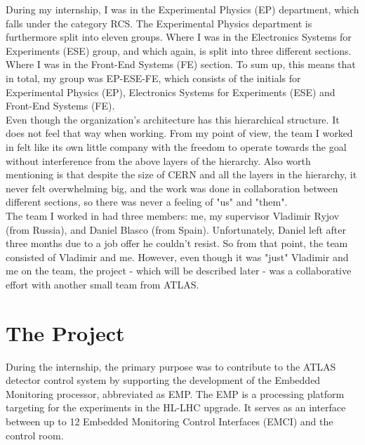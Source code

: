 \noindent During my internship, I was in the Experimental Physics (EP) department, which falls under the category RCS. The Experimental Physics department is furthermore split into eleven groups. Where I was in the Electronics Systems for Experiments (ESE) group, and which again, is split into three different sections. Where I was in the Front-End Systems (FE) section. To sum up, this means that in total, my group was EP-ESE-FE, which consists of the initials for Experimental Physics (EP), Electronics Systems for Experiments (ESE) and Front-End Systems (FE).\\

\noindent Even though the organization's architecture has this hierarchical structure. It does not feel that way when working. From my point of view, the team I worked in felt like its own little company with the freedom to operate towards the goal without interference from the above layers of the hierarchy. Also worth mentioning is that despite the size of CERN and all the layers in the hierarchy, it never felt overwhelming big, and the work was done in collaboration between different sections, so there was never a feeling of "us" and "them".\\

\noindent The team I worked in had three members: me, my supervisor Vladimir Ryjov (from Russia), and Daniel Blasco (from Spain). Unfortunately, Daniel left after three months due to a job offer he couldn't resist. So from that point, the team consisted of Vladimir and me. However, even though it was "just" Vladimir and me on the team, the project - which will be described later - was a collaborative effort with another small team from ATLAS.


\chapter{The Project}

During the internship, the primary purpose was to contribute to the ATLAS detector control system by supporting the development of the Embedded Monitoring processor, abbreviated as EMP. The EMP is a processing platform targeting for the experiments in the HL-LHC upgrade. It serves as an interface between up to 12 Embedded Monitoring Control Interfaces (EMCI) and the control room.

